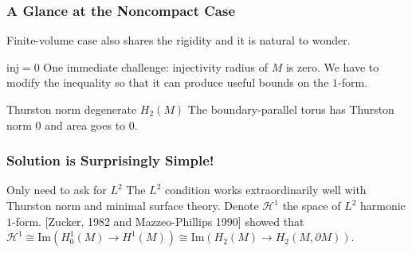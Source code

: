 \documentclass[t]{beamer}
\newcommand{\lh}{\mathcal{H}^1}
\newcommand{\Ima}{\text{Im}(H_2(M) \rightarrow H_2(M, \partial M))}
\newcommand{\fma}{\text{Im}(H^1_0(M) \rightarrow H^1(M))}
\begin{document}
\begin{frame}
	\frametitle{A Glance at the Noncompact Case}
	Finite-volume case also shares the rigidity and it is natural to wonder. 
	\begin{block}{inj$=0$}
		One immediate challenge: injectivity radius of $M$ is zero. We have to modify the inequality so that it can produce useful bounds on the $1$-form.  
	\end{block}
	\begin{block}{Thurston norm degenerate $H_2(M)$}
		The boundary-parallel torus has Thurston norm $0$ and area goes to $0$. 
	\end{block}
\end{frame}

\begin{frame}[t]
	\frametitle{Solution is Surprisingly Simple!}
	\begin{block}{Only need to ask for $L^2$}
		The $L^2$ condition works extraordinarily well with Thurston norm and minimal surface theory. Denote $\lh$ the space of $L^2$ harmonic $1$-form. [Zucker, 1982 and Mazzeo-Phillips 1990] showed that $\lh  \cong \fma \cong \Ima$. 
	\end{block}
\end{frame}

\end{document}
